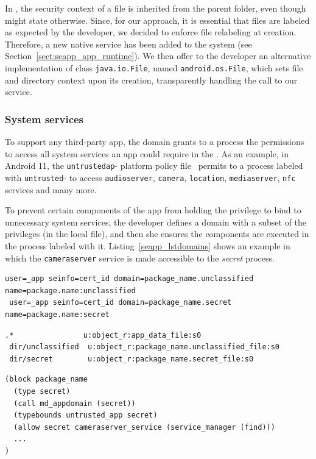 In \sel, the security context of a file is inherited from the parent
folder, even though \filecontexts might state otherwise.  Since, for
our approach, it is essential that files are labeled as expected by
the developer, we decided to enforce file relabeling at creation.
Therefore, a new native service has been added to the system (see
Section~\ref{sect:seapp_app_runtime}).  We then offer to the developer an
alternative implementation of class \texttt{java.io.File}, named
\texttt{android.os.File}, which sets file and directory context upon
its creation, transparently handling the call to our service.


\subsubsection{System services}\label{subsub:seapp_service_control}

To support any third-party app, the \untrustedapp domain grants to a
process the permissions to access all system services an app could
require in the \manifest.  As an example, in Android 11, the
\texttt{untrusted\textunderscore ap}-  platform policy file~\cite{seapp_untrustedappte} permits to
a process labeled with {\tt untrusted}-  to access \texttt{audioserver}, \texttt{camera},
\texttt{location}, \texttt{mediaserver}, \texttt{nfc} services and
many more.

To prevent certain components of the app from holding the privilege to
bind to unnecessary system services, the developer defines a domain
with a subset of the \untrustedapp privileges (in the local \sepolicy
file), and then she ensures the components are executed in the process
labeled with it.  Listing~\ref{seapp_lstdomains} shows an example in
which the {\tt cameraserver} service is made accessible to the {\em
  secret} process.  \newline
\begin{lstlisting}[language=policyfile, caption=\seappcontexts
example, label=seapp_lstseapp, numbersep=2pt,resetmargins=false]
 user=_app seinfo=cert_id domain=package_name.unclassified name=package.name:unclassified
 user=_app seinfo=cert_id domain=package_name.secret name=package.name:secret
\end{lstlisting}
%
\begin{lstlisting}[language=policyfile, caption=\filecontexts
example, label=seapp_lstfile, numbersep=2pt,resetmargins=false]
 .*                u:object_r:app_data_file:s0
 dir/unclassified  u:object_r:package_name.unclassified_file:s0
 dir/secret        u:object_r:package_name.secret_file:s0
\end{lstlisting}
%
\begin{lstlisting}[language=policyfile, caption=Granting \texttt{cameraserver}
access to secret domain, label=seapp_lstdomains, numbersep=2pt,resetmargins=false]
(block package_name
  (type secret)
  (call md_appdomain (secret))
  (typebounds untrusted_app secret)
  (allow secret cameraserver_service (service_manager (find)))
  ...
)
\end{lstlisting}


